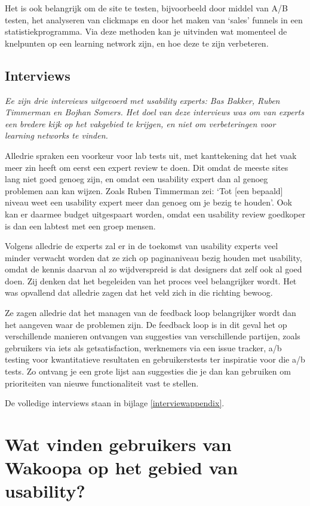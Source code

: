 \documentclass[a4paper, 10pt, pdftex]{report}
\begin{document}
    Het is ook belangrijk om de site te testen, bijvoorbeeld door middel van A/B testen, het analyseren van clickmaps en door het maken van `sales' funnels in een statistiekprogramma. Via deze methoden kan je uitvinden wat momenteel de knelpunten op een learning network zijn, en hoe deze te zijn verbeteren.

  \section{Interviews}
    \emph{Ee zijn drie interviews uitgevoerd met usability experts: Bas Bakker, Ruben Timmerman en Bojhan Somers. Het doel van deze interviews was om van experts een bredere kijk op het vakgebied te krijgen, en niet om verbeteringen voor learning networks te vinden.}

    Alledrie spraken een voorkeur voor lab tests uit, met kanttekening dat het vaak meer zin heeft om eerst een expert review te doen. Dit omdat de meeste sites lang niet goed genoeg zijn, en omdat een usability expert dan al genoeg problemen aan kan wijzen. Zoals Ruben Timmerman zei: `Tot [een bepaald] niveau weet een usability expert meer dan genoeg om je bezig te houden'. Ook kan er daarmee budget uitgespaart worden, omdat een usability review goedkoper is dan een labtest met een groep mensen.

    Volgens alledrie de experts zal er in de toekomst van usability experts veel minder verwacht worden dat ze zich op paginaniveau bezig houden met usability, omdat de kennis daarvan al zo wijdverspreid is dat designers dat zelf ook al goed doen. Zij denken dat het begeleiden van het proces veel belangrijker wordt. Het was opvallend dat alledrie zagen dat het veld zich in die richting bewoog.

    Ze zagen alledrie dat het managen van de feedback loop belangrijker wordt dan het aangeven waar de problemen zijn. De feedback loop is in dit geval het op verschillende manieren ontvangen van suggesties van verschillende partijen, zoals gebruikers via iets als getsatisfaction, werknemers via een issue tracker, a/b testing voor kwantitatieve resultaten en gebruikerstests ter inspiratie voor die a/b tests. Zo ontvang je een grote lijst aan suggesties die je dan kan gebruiken om prioriteiten van nieuwe functionaliteit vast te stellen.

    De volledige interviews staan in bijlage \ref{interviewappendix}.

  \newpage
  \chapter{Wat vinden gebruikers van Wakoopa op het gebied van usability?}
    \label{userchapter}
    \newpage
\end{document}
